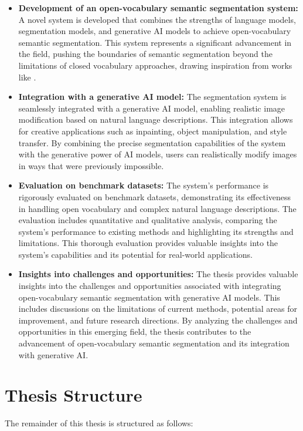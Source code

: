 \begin{itemize}
\item \textbf{Development of an open-vocabulary semantic segmentation system:} A novel system is developed that combines the strengths of language models, segmentation models, and generative AI models to achieve open-vocabulary semantic segmentation. This system represents a significant advancement in the field, pushing the boundaries of semantic segmentation beyond the limitations of closed vocabulary approaches, drawing inspiration from works like \cite{ghiasi2022open}.
\item \textbf{Integration with a generative AI model:} The segmentation system is seamlessly integrated with a generative AI model, enabling realistic image modification based on natural language descriptions. This integration allows for creative applications such as inpainting, object manipulation, and style transfer. By combining the precise segmentation capabilities of the system with the generative power of AI models, users can realistically modify images in ways that were previously impossible.
\item \textbf{Evaluation on benchmark datasets:} The system's performance is rigorously evaluated on benchmark datasets, demonstrating its effectiveness in handling open vocabulary and complex natural language descriptions. The evaluation includes quantitative and qualitative analysis, comparing the system's performance to existing methods and highlighting its strengths and limitations. This thorough evaluation provides valuable insights into the system's capabilities and its potential for real-world applications.
\item \textbf{Insights into challenges and opportunities:} The thesis provides valuable insights into the challenges and opportunities associated with integrating open-vocabulary semantic segmentation with generative AI models. This includes discussions on the limitations of current methods, potential areas for improvement, and future research directions. By analyzing the challenges and opportunities in this emerging field, the thesis contributes to the advancement of open-vocabulary semantic segmentation and its integration with generative AI.
\end{itemize}

\section{Thesis Structure}

The remainder of this thesis is structured as follows:

